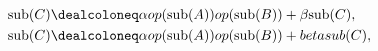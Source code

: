 \documentclass{article}
\begin{document}
\begin{align*}
\mathrm{sub}(C) &\dealcoloneq \alpha
op(\mathrm{sub}(A))op(\mathrm{sub}(B))
                           + \beta \mathrm{sub}(C), \\
\mathrm{sub}(C) &\dealcoloneq \alpha
op(\mathrm{sub}(A))op(\mathrm{sub}(B))
                           + beta sub(C),
\end{align*}
\pagebreak
\end{document}
